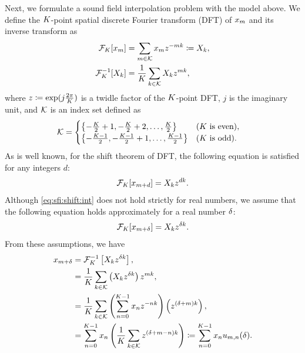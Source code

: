 \documentclass[sip,biber]{now-journal}
\begin{document}
Next, we formulate a sound field interpolation problem with the model above.
We define the $K$-point spatial discrete Fourier transform (DFT) of $x _{m}$ and its inverse transform as
\begin{align}
  \dft _{\Src} [\sfcma _{\mic}] &= \sum _{\mic \in \SRC} \sfcma _{\mic} \twid ^{-\mic\src} \coloneqq \Sfcma _{\src},\\
  \dft _{\Src} ^{-1} [\Sfcma _{\src}] &= \frac{1}{\Mic} \sum _{\src \in \SRC} \Sfcma _{\src} \twid ^{\mic\src},%
\end{align}
where $z \coloneqq \exp (j \frac{2\pi}{K})$ is a twidle factor of the $K$-point DFT, $j$ is the imaginary unit, and $\mathcal{K}$ is an index set defined as
\begin{align}
  \mathcal{K} &=
  \begin{cases}
    \left\{-\frac{K}{2} + 1, -\frac{K}{2} + 2, \dots, \frac{K}{2}\right\} & \text{($K$ is even)}, \\
    \left\{-\frac{K - 1}{2}, -\frac{K - 1}{2} + 1, \dots, \frac{K - 1}{2}\right\} & \text{($K$ is odd)}.
  \end{cases}
\end{align}
As is well known, for the shift theorem of DFT, the following equation is satisfied for any integers $d$:
\begin{equation}
  \dft _{\Src} [\sfcma _{\mic + d}] = \Sfcma _{\src} \twid ^{d \src}.%
  \label{eq:sfi:shift:int}
\end{equation}
Although \eqref{eq:sfi:shift:int} does not hold strictly for real numbers, we assume that the following equation holds approximately for a real number $\delta$:
\begin{equation}
  \dft _{\Src} [\sfcma _{\mic + \rotSmpl}] = \Sfcma _{\src} \twid ^{\rotSmpl \src}.%
  \label{eq:sfi:shift:dft}
\end{equation}
From these assumptions, we have
\begin{align}
  x _{m + \delta} &= \mathcal{F} _{K} ^{-1} \left[X _{k} z ^{\delta k}\right], \\
                            &= \frac{1}{K} \sum _{k \in \mathcal{K}} \left(X _{k}z ^{\delta k} \right) z ^{mk}, \\
                            &= \frac{1}{K} \sum _{k \in \mathcal{K}} \left(\sum _{n=0} ^{K - 1} x _{n} z ^{-nk}\right) \left( z ^{(\delta + m)k} \right), \\
                            &= \sum _{n = 0} ^{K - 1} x _{n} \left( \frac{1}{K} \sum _{k \in \mathcal{K}} z ^{(\delta + m - n)k} \right)
                            \coloneqq \sum _{n = 0} ^{K - 1} x _{n} u _{m, n}(\delta) \label{eq:sfi:elem}.
\end{align}
\end{document}
